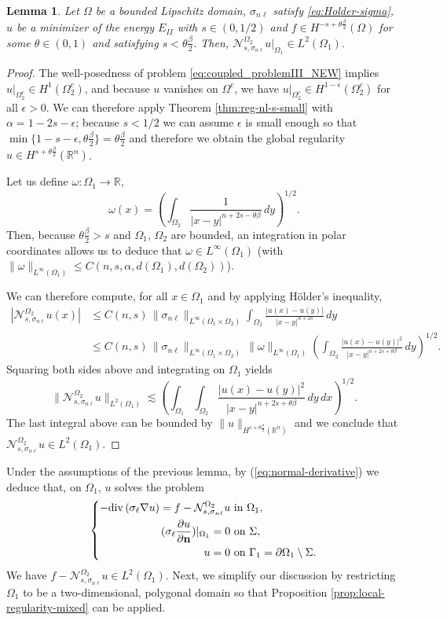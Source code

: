 \documentclass{amsart}
\newcommand{\Ol}{\Omega_{1}}%
\newcommand{\Onl}{\Omega_{2}}%
\newcommand{\Gl}{{\Gamma_1}}%
\renewcommand{\sl}{{\sigma_\ell}}
\newcommand{\snl}{{\sigma_{n\ell}}}
\def\vn{{\mathbf n}}
\def\R{{\mathbb R}}
\newcommand{\Nsnl}{\mathcal{N}_{s,\snl}}
\renewcommand{\div}{{\rm div}\,}
\theoremstyle{plain}
\newtheorem{lemma}{Lemma}
\numberwithin{equation}{section}
\numberwithin{table}{section}
\numberwithin{figure}{section}
\numberwithin{theorem}{section}
\numberwithin{corollary}{section}
\numberwithin{definition}{section}
\numberwithin{lemma}{section}
\numberwithin{proposition}{section}
\numberwithin{remark}{section}
\begin{document}
\begin{lemma}
Let $\Omega$ be a bounded Lipschitz domain, $\snl$ satisfy \eqref{eq:Holder-sigma}, $u$ be a minimizer of the energy $E_{II}$ with $s \in (0, 1/2)$ and $f \in H^{-s+\theta\frac\beta2}(\Omega)$ for some $\theta \in (0,1)$ and satisfying $s < \theta\frac\beta2$. Then, $\Nsnl^{\Onl} u \big|_{\Ol}  \in L^2(\Ol)$.
\end{lemma}
\begin{proof}
The well-posedness of problem \eqref{eq:coupled_problemIII_NEW} implies $u|_{\Onl^c} \in H^1(\Onl^c)$, and because $u$ vanishes on $\Omega^c$, we have $u|_{\Onl^c} \in H^{1-\epsilon}(\Onl^c)$ for all $\epsilon > 0$. We can therefore apply Theorem \ref{thm:reg-nl-s-small} with $\alpha = 1 - 2s - \epsilon$; because $s < 1/2$ we can assume $\epsilon$ is small enough so that $\min\{ 1- s - \epsilon, \theta\frac\beta2 \} = \theta\frac\beta2$ and therefore we obtain the global regularity $u \in H^{s+\theta\frac\beta2}(\R^n)$.

Let us define $\omega \colon \Ol \to \R$,
\[
\omega (x) = \left(\int_{\Onl} \frac{1}{|x-y|^{n+2s- \theta\beta}} \, dy \right)^{1/2}.
\]
Then, because $ \theta\frac\beta2 > s$ and $\Ol$, $\Onl$ are bounded, an integration in polar coordinates allows us to deduce that $\omega \in L^\infty(\Ol)$ (with $ \| \omega \|_{L^\infty(\Ol)} \le C( n, s, \alpha, d(\Ol), d(\Onl) )$).

We can therefore compute, for all $x \in \Ol$ and by applying H\"older's inequality,
\[ \begin{split}
|\Nsnl^{\Onl} u (x)| & \le C(n,s) \, \| \snl \|_{L^\infty(\Ol \times \Onl)} \int_{\Onl} \frac{|u(x)-u(y)|}{|x-y|^{n+2s}} \, dy \\
& \le C(n,s) \, \| \snl \|_{L^\infty(\Ol \times \Onl)} \, \| \omega \|_{L^\infty(\Ol)} \left(\int_{\Onl} \frac{|u(x)-u(y)|^2}{|x-y|^{n+2s+\theta\beta}} \, dy \right)^{1/2}.
\end{split} \]
Squaring both sides above and integrating on $\Ol$ yields
\[
\| \Nsnl^{\Onl} u \|_{L^2(\Ol)}  
\lesssim \left(\int_{\Ol} \int_{\Onl} \frac{|u(x)-u(y)|^2}{|x-y|^{n+2s+\theta\beta}} \, dy \, dx \right)^{1/2}.
\]
The last integral above can be bounded by $\| u \|_{H^{s+\theta\frac\beta2}(\R^n)}$ and we conclude that  $\Nsnl^{\Onl} u \in L^2(\Ol)$. 
\end{proof}

Under the assumptions of the previous lemma, by (\ref{eq:normal-derivative}) we deduce that, on $\Ol$, $u$ solves the problem 
\[
 \left\lbrace \begin{aligned}
-\div (\sl \nabla u) = f - \Nsnl^{\Onl} u   & \mbox{ in } \Ol, \\
(\sl \frac{\partial u}{\partial \vn})|_{\Ol} = 0 & \mbox{ on } \Sigma, \\
u = 0 & \mbox{ on } \Gl = \partial\Ol \setminus \Sigma.
\end{aligned} \right.
\]
We have $f - \Nsnl^{\Onl} u \in L^2(\Ol)$. Next, we simplify our discussion by restricting $\Ol$ to be a two-dimensional, polygonal domain so that Proposition \ref{prop:local-regularity-mixed} can be applied.
\end{document}
